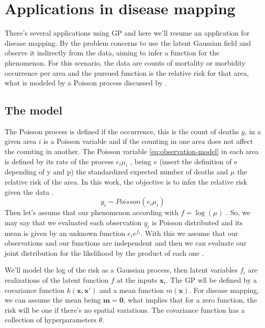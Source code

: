 \section{Applications in disease mapping}
There's several applications using GP and here we'll resume an application for disease mapping. By \cite{Vanhatalo2010Vehtari} the problem concerns to use the latent Gaussian field and observe it indirectly from the data, aiming to infer a function for the phenomenon. For this scenario, the data are counts of mortality or morbidity occurrence per area and the pursued function is the relative risk for that area, what is modeled by a Poisson process discussed by \cite{Best2005}.

\subsection{The model}

The Poisson process is defined if the occurrence, this is the count of deaths $y$, in a given area $i$ is a Poisson variable and if the counting in one area does not affect the counting in another. The Poisson variable \ref{eq:observation-model} in each area is defined by its rate of the process $e_i\mu_i$ \cite{Best2005,Samat2012}, being $e$ {\color{red}(insert the definition of e depending of y and p)} the standardized expected number of deaths and $\mu$ the relative risk of the area. In this work, the objective is to infer the relative risk given the data \cite{lawson2013statistical}. 
%
\begin{equation}
    y_i \sim Poisson(e_i\mu_i)
    \label{eq:observation-model}
\end{equation}
%
Then let's assume that our phenomenon according with $f=\log (\mu)$ \cite{Best2005}. So, we may say that we evaluated each observation $y_i$ is Poisson distributed and its mean is given by an unknown function $e_i e^{f_i}$. With this we assume that our observations and our functions are independent and then we can evaluate our joint distribution for the likelihood by the product of each one \cite{jarno2010}.

We'll model the log of the risk as a Gaussian process, then latent variables $f_i$ are realizations of the latent function $f$ at the inputs $\mathbf{x}_i$. The GP wll be defined by a covariance function $k(\mathbf{x},\mathbf{x}')$ and a mean function $m(\mathbf{x})$. For disease mapping, we can assume the mean being $\mathbf{m}=\mathbf{0}$, what implies that for a zero function, the risk will be one if there's no spatial variations. The covariance function has a collection of hyperparameters $\theta$.

